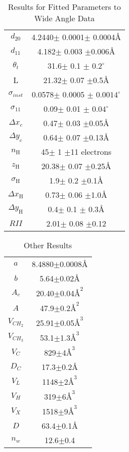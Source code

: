 \narrowtext

\begin{table}
\caption{Results for Fitted Parameters to Wide Angle Data
\label{table1}}
\begin{tabular}{cc}
$d_{20}$                	& 4.2440$\pm$ 0.0001$\pm$ 0.0004\AA\\
$d_{11}$                	& 4.182$\pm$ 0.003 $\pm$0.006\AA\\
${\theta}_{t}$  		& 31.6$\pm$ 0.1 $\pm$ $0.2^{\circ}$\\
L            			& 21.32$\pm$ 0.07 $\pm$0.5\AA\\
${\sigma}_{inst}$		& 0.0578$\pm$ 0.0005 $\pm$ $0.0014^{\circ}$\\
${\sigma}_{11}$  		& 0.09$\pm$ 0.01 $\pm$ $0.04^{\circ}$\\
${\Delta x}_{c}$  		& 0.47$\pm$ 0.03 $\pm$0.05\AA\\
${\Delta y}_{c}$  		& 0.64$\pm$ 0.07 $\pm$0.13\AA\\
$n_{\text{H}}$       		& 45$\pm$ 1 $\pm$11 electrons\\
$z_{\text{H}}$       		& 20.38$\pm$ 0.07 $\pm$0.25\AA\\
${\sigma}_{\text{H}}$   	& 1.9$\pm$ 0.2 $\pm$0.1\AA\\
${\Delta x}_{\text{H}}$  	& 0.73$\pm$ 0.06 $\pm$1.0\AA\\
${\Delta y}_{\text{H}}$  	& 0.4$\pm$ 0.1 $\pm$ 0.3\AA\\
$RII$           		& 2.01$\pm$ 0.08 $\pm$0.12\\
\end{tabular}
\end{table}

\begin{table}
\caption{Other Results
\label{table2}}
\begin{tabular}{cc}
$a$            	& 8.4880$\pm$0.0008\AA\\
$b$            	& 5.64$\pm$0.02\AA\\
$A_{c}$       	& 20.40$\pm$0.04${\text{\AA}}^{2}$\\
$A$            	& 47.9$\pm$0.2${\text{\AA}}^{2}$\\
$V_{{CH}_2}$    & 25.91$\pm$0.05${\text{\AA}}^{3}$\\
$V_{{CH}_3}$   	& 53.1$\pm$1.3${\text{\AA}}^{3}$\\
$V_{C}$      	& 829$\pm$4${\text{\AA}}^{3}$\\
$D_{C}$       	& 17.3$\pm$0.2\AA\\
$V_{L}$       	& 1148$\pm$2${\text{\AA}}^{3}$\\
$V_{H}$       	& 319$\pm$6${\text{\AA}}^{3}$\\
$V_{X}$       	& 1518$\pm$9${\text{\AA}}^{3}$\\
$D$            	& 63.4$\pm$0.1\AA\\
$n_{w}$       	& 12.6$\pm$0.4\\
\end{tabular}
\end{table}


